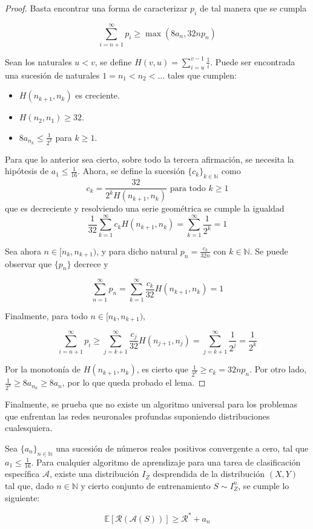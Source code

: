 \begin{proof}
Basta encontrar una forma de caracterizar $p_i$ de tal manera que se cumpla

$$\sum_{i=n+1}^{\infty}p_i \geq \max(8a_n,32np_n)$$

Sean los naturales $u < v$, se define $H(v,u)=\sum_{i=u}^{v-1} \frac{1}{i}$. Puede ser encontrada una sucesión de naturales $1=n_1 < n_2 < \dots$ tales que cumplen:
\begin{itemize}
	\item $H(n_{k+1},n_k)$ es creciente.
	\item $H(n_2,n_1) \geq 32$.
	\item $8a_{n_k} \leq \frac{1}{2^k}$ para $k \geq 1$.
\end{itemize}

Para que lo anterior sea cierto, sobre todo la tercera afirmación, se necesita la hipótesis de $a_1 \leq \frac{1}{16}$. Ahora, se define la sucesión $\{c_k\}_{k \in \mathbb{N}}$ como 
$$c_k = \frac{32}{2^kH(n_{k+1},n_k)} \text{ para todo } k \geq 1$$
que es decreciente y resolviendo una serie geométrica se cumple la igualdad 
$$\frac{1}{32}\sum_{k=1}^{\infty} c_kH(n_{k+1},n_k)=\sum_{k=1}^{\infty} \frac{1}{2^k}=1$$

Sea ahora $n \in [n_k,n_{k+1})$, y para dicho natural $p_n = \frac{c_k}{32n}$ con $k \in \mathbb{N}$. Se puede observar que $\{p_n\}$ decrece y

$$\sum_{n=1}^\infty p_n = \sum_{k=1}^{\infty} \frac{c_k}{32} H(n_{k+1},n_k) = 1$$

Finalmente, para todo $n \in [n_k,n_{k+1}),$

\[
\sum_{i=n+1}^{\infty} p_i \geq \sum_{j=k+1}^{\infty} \frac{c_j}{32}H(n_{j+1},n_j) = \sum_{j=k+1}^{\infty} \frac{1}{2^j} = \frac{1}{2^k}
\]

Por la monotonía de $H(n_{k+1},n_k)$, es cierto que $\frac{1}{2^k} \geq c_k = 32np_n$. Por otro lado, $\frac{1}{2^k} \geq 8a_{n_k} \geq 8a_n$, por lo que queda probado el lema.

\end{proof}

Finalmente, se prueba que no existe un algoritmo universal para los problemas que enfrentan las redes neuronales profundas suponiendo distribuciones cualesquiera.

\begin{teorema}

Sea $\{a_n\}_{n \in \mathbb{N}}$ una sucesión de números reales positivos convergente a cero, tal que $a_1 \leq \frac{1}{16}$. Para cualquier algoritmo de aprendizaje para una tarea de clasificación específica $\mathcal{A}$, existe una distribución $I_Z$ desprendida de la distribución $(X,Y)$ tal que, dado $n \in \mathbb{N}$ y cierto conjunto de entrenamiento $S \sim I_Z^n$, se cumple lo siguiente:

$$\mathbb{E}[\mathcal{R}(\mathcal{A}(S))] \geq \mathcal{R}^{*}+a_n$$

\end{teorema}

